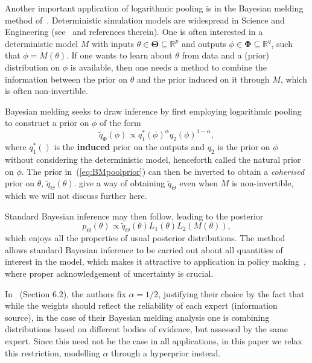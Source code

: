 \documentclass[a4paper, notitlepage, 10pt]{article}
\begin{document}
Another important application of logarithmic pooling is in the Bayesian melding method of~\cite{poole2000}.
Deterministic simulation models are widespread in Science and Engineering (see~\cite{poole2000} and references therein).
One is often interested in a deterministic model $M$ with inputs $\theta \in \boldsymbol\Theta \subseteq \mathbb{R}^p$ and outputs $\phi \in \boldsymbol\Phi\subseteq \mathbb{R}^q$, such that $\phi = M(\theta)$.
If one wants to learn about $\theta$ from data and a (prior) distribution on $\phi$ is available, then one needs a method to combine the information between the prior on $\theta$ and the prior induced on it  through $M$, which is often non-invertible.

Bayesian melding seeks to draw inference by first employing logarithmic pooling to construct a prior on $\phi$ of the form
\begin{equation}
 \label{eq:BMpoolprior}
 \tilde{q}_{\Phi}(\phi) \propto q_1^\ast(\phi)^\alpha q_2(\phi)^{1-\alpha},
\end{equation}
where $q_1^\ast()$ is the \textbf{induced} prior on the outputs and $q_2$ is the prior on $\phi$ without considering the deterministic model, henceforth called the natural prior on $\phi$.
The prior in~(\ref{eq:BMpoolprior}) can then be inverted to obtain a \textit{coherised} prior on $\theta$, $\tilde{q}_{\Theta}(\theta)$.
\cite{poole2000} give  a way of obtaining $\tilde{q}_{\Theta}$ even when $M$ is non-invertible, which we will not discuss further here. 

Standard Bayesian inference may then follow,  leading to the posterior
\begin{equation}
 \label{eq:BMpoolposterior}
 p_{\Theta}(\theta) \propto \tilde{q}_{\Theta}(\theta) L_1(\theta) L_2(M(\theta)),
\end{equation}
which enjoys all the properties of usual posterior distributions.
The method allows standard Bayesian inference to be carried out about all quantities of interest in the model, which makes it attractive to application in policy making~\citep{alkema2008}, where proper acknowledgement of uncertainty is crucial.

In~\cite{poole2000} (Section 6.2), the authors fix $\alpha = 1/2$, justifying their choice by the fact that while the weights should reflect the reliability of each expert (information source), in the case of their Bayesian melding analysis one is combining distributions based on different bodies of evidence, but assessed by the same expert.
Since this need not be the case in all applications, in this paper we relax this restriction, modelling $\alpha$ through a hyperprior instead. 
\end{document}
